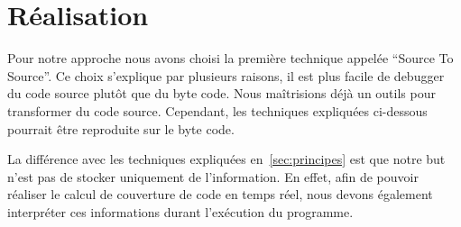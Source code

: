 \section{Réalisation}

Pour notre approche nous avons choisi la première technique appelée “Source To Source”. Ce choix s'explique par plusieurs raisons, il est plus facile de debugger du code source plutôt que du byte code. Nous maîtrisions déjà un outils pour transformer du code source. Cependant, les techniques expliquées ci-dessous pourrait être reproduite sur le byte code. \par La différence avec les techniques expliquées en~\ref{sec:principes} est que notre but n'est pas de stocker uniquement de l'information. En effet, afin de pouvoir réaliser le calcul de couverture de code en temps réel, nous devons également interpréter ces informations durant l'exécution du programme. 
